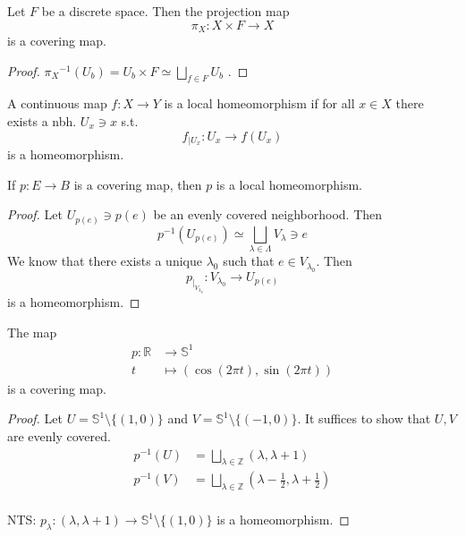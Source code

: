 \begin{example}
    Let \( F \) be a discrete space.
    Then the projection map
    \[
      \pi_X: X \times F \to X
    \]
    is a covering map.
\end{example}

\begin{proof}
  \( {\pi_X}^{-1}(U_b) = U_b \times F \simeq \bigsqcup_{f \in F} U_b  \) .
\end{proof}

\begin{definition}
    A continuous map \( f: X \to Y \) 
    is a local homeomorphism if 
    for all \( x \in X \) there exists
    a nbh. \( U_x \ni x \) s.t.
    \[
      f_{|U_x}: U_x \to f(U_x)
    \]
    is a homeomorphism.
\end{definition}

\begin{proposition}
   If \( p: E \to B \)  is a covering map,
   then \( p \) is a local homeomorphism.
\end{proposition}

\begin{proof}
  Let \( U_{p(e)} \ni p(e)  \) be an 
  evenly covered neighborhood.
  Then
  \[
    {p}^{-1} (U_{p(e)}) \simeq
    \bigsqcup_{\lambda \in \Lambda} V_\lambda \ni e
  \]
  We know that there exists a unique 
\( \lambda_0 \) such that \( e \in V_{\lambda_0} \).
  Then
  \[
    p_{|_{V_{\lambda_0}}}: V_{\lambda_0} \longrightarrow U_{p(e)}
  \]
  is a homeomorphism.
\end{proof}

\begin{theorem}
    The map 
    \begin{align}
      p: \mathbb{R} &\to \mathbb{S}^1 \\
      t &\mapsto (\cos(2\pi t), \sin(2\pi t))
    \end{align}
    is a covering map.
\end{theorem}

\begin{proof}
    Let \( U = \mathbb{S}^1 \setminus \{ (1, 0) \}  \)
    and \( V = \mathbb{S}^1 \setminus \{ (-1, 0) \}  \).
    It suffices to show that
    \( U, V \) are evenly covered.
    \begin{align*}
      {p}^{-1} (U) &= \bigsqcup_{\lambda \in \mathbb{Z}} (\lambda, \lambda + 1) \\
      {p}^{-1} (V) &= \bigsqcup_{\lambda \in \mathbb{Z}} (\lambda - \frac{1}{2}, \lambda + \frac{1}{2}) \\
    \end{align*}

    NTS: \( p_\lambda: (\lambda, \lambda + 1) \to \mathbb{S}^1 \setminus \{ (1, 0) \}  \)
    is a homeomorphism.
\end{proof}

